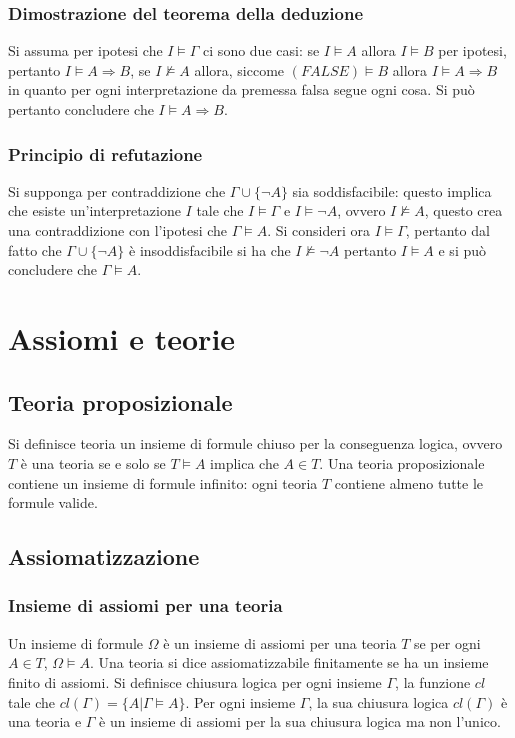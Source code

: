 \subsubsection{Dimostrazione del teorema della deduzione}
Si assuma per ipotesi che $I\models\Gamma$ ci sono due casi: se $I\models A$ allora $I\models B$ per ipotesi, pertanto $I\models A\Rightarrow B$, se $I\not\models A$ allora, siccome $(FALSE)\models 
B$ allora $I\models A\Rightarrow B$ in quanto per ogni interpretazione da premessa falsa segue ogni cosa. Si pu\`o pertanto concludere che $I\models A\Rightarrow B$. 
\subsubsection{Principio di refutazione}
Si supponga per contraddizione che $\Gamma\cup\{\neg A\}$ sia soddisfacibile: questo implica che esiste un'interpretazione $I$ tale che $I\models\Gamma$ e $I\models\neg A$, ovvero $I\not\models A$, 
questo crea una contraddizione con l'ipotesi che $\Gamma\models A$. Si consideri ora $I\models\Gamma$, pertanto dal fatto che $\Gamma\cup\{\neg A\}$ \`e insoddisfacibile si ha che $I\not\models\neg A$
pertanto $I\models A$ e si pu\`o concludere che $\Gamma\models A$. 
\section{Assiomi e teorie}
\subsection{Teoria proposizionale}
Si definisce teoria un insieme di formule chiuso per la conseguenza logica, ovvero $T$ \`e una teoria se e solo se $T\models A$ implica che $A\in T$. Una teoria proposizionale contiene un insieme di formule
infinito: ogni teoria $T$ contiene almeno tutte le formule valide.
\subsection{Assiomatizzazione}
\subsubsection{Insieme di assiomi per una teoria}
Un insieme di formule $\Omega$ \`e un insieme di assiomi per una teoria $T$ se per ogni $A\in T$, $\Omega\models A$. Una teoria si dice assiomatizzabile finitamente se ha un insieme finito di assiomi. Si
definisce chiusura logica per ogni insieme $\Gamma$, la funzione $cl$ tale che $cl(\Gamma)=\{A|\Gamma\models A\}$. Per ogni insieme $\Gamma$, la sua chiusura logica $cl(\Gamma)$ \`e una teoria e 
$\Gamma$ \`e un insieme di assiomi per la sua chiusura logica ma non l'unico.
